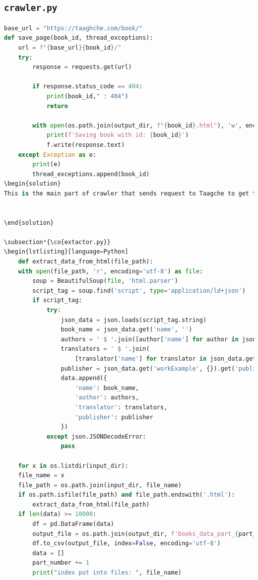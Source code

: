 \documentclass{solutionclass} %
\def\co#1{\texttt{#1}}
\begin{document}
\subsection*{\co{crawler.py}}
\begin{lstlisting}[language=Python]
base_url = "https://taaghche.com/book/"
def save_page(book_id, thread_exceptions):
	url = f"{base_url}{book_id}/"
	try:
		response = requests.get(url)
		
		if response.status_code == 404:
			print(book_id," : 404")
			return
		
		with open(os.path.join(output_dir, f"{book_id}.html"), 'w', encoding='utf-8') as f:
			print(f'Saving book with id: {book_id}')
			f.write(response.text)
	except Exception as e:
		print(e)
		thread_exceptions.append(book_id)
\begin{solution}
This is the main part of crawler that sends request to Taagche to get the book pages and save them into files. We also used python threading features to make the whole process faster.


\end{solution}

\subsection*{\co{extactor.py}}
\begin{lstlisting}[language=Python]
    def extract_data_from_html(file_path):
    with open(file_path, 'r', encoding='utf-8') as file:
        soup = BeautifulSoup(file, 'html.parser')
        script_tag = soup.find('script', type='application/ld+json')
        if script_tag:
            try:
                json_data = json.loads(script_tag.string)
                book_name = json_data.get('name', '')
                authors = ' $ '.join([author['name'] for author in json_data.get('author', [])])
                translators = ' $ '.join(
                    [translator['name'] for translator in json_data.get('workExample', {}).get('translator', [])])
                publisher = json_data.get('workExample', {}).get('publisher', {}).get('name', '')
                data.append({
                    'name': book_name,
                    'author': authors,
                    'translator': translators,
                    'publisher': publisher
                })
            except json.JSONDecodeError:
                pass

    for x in os.listdir(input_dir):
    file_name = x
    file_path = os.path.join(input_dir, file_name)
    if os.path.isfile(file_path) and file_path.endswith('.html'):
        extract_data_from_html(file_path)
    if len(data) >= 10000:
        df = pd.DataFrame(data)
        output_file = os.path.join(output_dir, f'books_data_part_{part_number}.csv')
        df.to_csv(output_file, index=False, encoding='utf-8')
        data = []
        part_number += 1
        print("index put into files: ", file_name)


\end{lstlisting}
\end{document}
